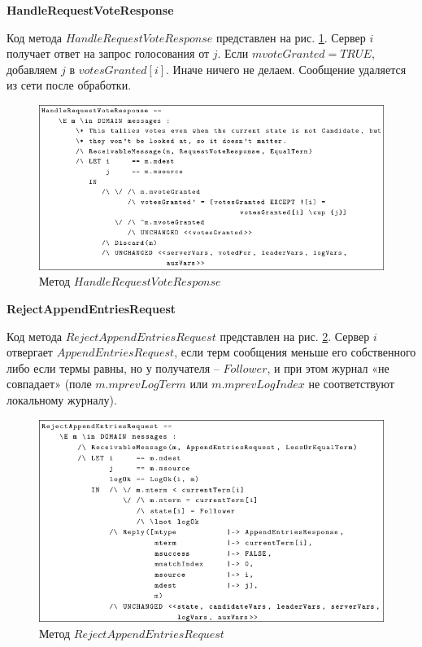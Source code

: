 \textbf{HandleRequestVoteResponse}

Код метода $HandleRequestVoteResponse$ представлен на рис.
\ref{fig:tla-06-handle-request-vote-response}. Сервер $i$ получает ответ на
запрос голосования от $j$. Если $mvoteGranted = TRUE$, добавляем $j$ в
$votesGranted[i]$. Иначе ничего не делаем. Сообщение удаляется из сети после
обработки.

\begin{figure}
  \centering
  \includegraphics[scale=0.4]{inc/tla-06-handle-request-vote-response.png}
  \caption{Метод $HandleRequestVoteResponse$}
  \label{fig:tla-06-handle-request-vote-response}
\end{figure}

\textbf{RejectAppendEntriesRequest}

Код метода $RejectAppendEntriesRequest$ представлен на рис.
\ref{fig:tla-06-reject-append-entries}.
Сервер $i$ отвергает $AppendEntriesRequest$, если терм сообщения меньше его
собственного либо если термы равны, но у получателя – $Follower$, и при этом
журнал «не совпадает» (поле $m.mprevLogTerm$ или $m.mprevLogIndex$ не
соответствуют локальному журналу).

\begin{figure}
  \centering
  \includegraphics[scale=0.4]{inc/tla-06-reject-append-entries.png}
  \caption{Метод $RejectAppendEntriesRequest$}
  \label{fig:tla-06-reject-append-entries}
\end{figure}

